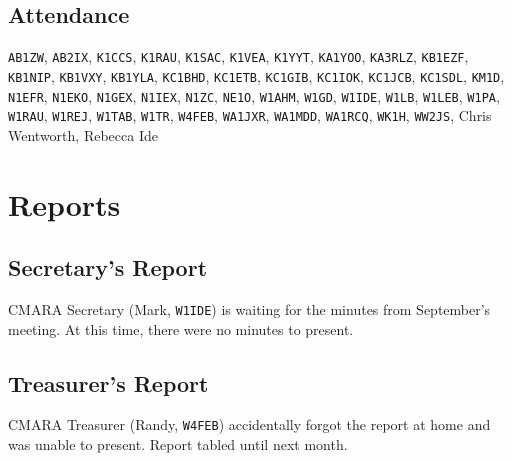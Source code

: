 \documentclass[10pt,letterpaper]{article}
\begin{document}
\subsection{Attendance}

\texttt{AB1ZW},
\texttt{AB2IX},
\texttt{K1CCS},
\texttt{K1RAU},
\texttt{K1SAC},
\texttt{K1VEA},
\texttt{K1YYT},
\texttt{KA1YOO},
\texttt{KA3RLZ},
\texttt{KB1EZF},
\texttt{KB1NIP},
\texttt{KB1VXY},
\texttt{KB1YLA},
\texttt{KC1BHD},
\texttt{KC1ETB},
\texttt{KC1GIB},
\texttt{KC1IOK},
\texttt{KC1JCB},
\texttt{KC1SDL},
\texttt{KM1D},
\texttt{N1EFR},
\texttt{N1EKO},
\texttt{N1GEX},
\texttt{N1IEX},
\texttt{N1ZC},
\texttt{NE1O},
\texttt{W1AHM},
\texttt{W1GD},
\texttt{W1IDE},
\texttt{W1LB},
\texttt{W1LEB},
\texttt{W1PA},
\texttt{W1RAU},
\texttt{W1REJ},
\texttt{W1TAB},
\texttt{W1TR},
\texttt{W4FEB},
\texttt{WA1JXR},
\texttt{WA1MDD},
\texttt{WA1RCQ},
\texttt{WK1H},
\texttt{WW2JS},
Chris Wentworth,
Rebecca Ide



\section{Reports}

\subsection{Secretary's Report}
CMARA Secretary (Mark, \texttt{W1IDE}) is waiting for the minutes from September's meeting. At this time, there were no minutes to present.

\newpage
\subsection{Treasurer's Report}
CMARA Treasurer (Randy, \texttt{W4FEB}) accidentally forgot the report at home and was unable to present. Report tabled until next month.
\end{document}

